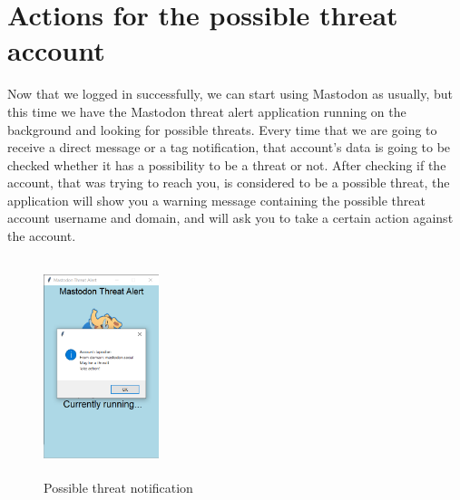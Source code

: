 \section{Actions for the possible threat account}
\label{s:Actions_threat}
Now that we logged in successfully, we can start using Mastodon as usually, but this
time we have the Mastodon threat alert application running on the background and looking
for possible threats.
\newline
Every time that we are going to receive a direct message or a tag notification, that account's
data is going to be checked whether it has a possibility to be a threat or not. After checking
if the account, that was trying to reach you, is considered to be a possible threat, the application
will show you a warning message containing the possible threat account username and domain,
and will ask you to take a certain action against the account.
\begin{figure}[H]
	\centering
	\includegraphics[width=0.3\textwidth,height=240px]{images/threatnotif.png}
	\caption{Possible threat notification}
	\label{fig:possible_threat_notification}
\end{figure}

